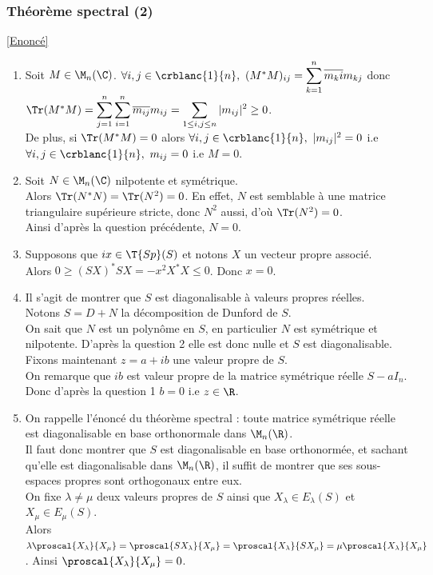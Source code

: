 \documentclass[8pt]{book}
\begin{document}
	\subsubsection{Théorème spectral (2) }
	\label{Théorème spectral (2) corrigé}
	\textcolor{blue}{\hyperref[Théorème spectral (2)]{[Enoncé]}}\\
	\begin{enumerate}[leftmargin=*]
		\item Soit $M\in \M_n(\C)$. $\forall i,j\in \crblanc{1}{n},\ (M^*M)_{ij}=\displaystyle\sum_{k=1}^n\overline{m_ki}m_{kj}$ donc $\Tr(M^*M)=\displaystyle\sum_{j=1}^n\sum_{i=1}^n\overline{m_{ij}}m_{ij}=\sum_{1\leq i,j\leq n}|m_{ij}|^2\geq 0$.\\
		De plus, si $\Tr(M^*M)=0$ alors $\forall i,j\in \crblanc{1}{n},\ |m_{ij}|^2=0$ i.e $\forall i,j\in \crblanc{1}{n},\ m_{ij}=0$ i.e $M=0$.
		\item Soit $N\in \M_n(\C)$ nilpotente et symétrique.\\
		Alors $\Tr(N^*N)=\Tr(N^2)=0$. En effet, $N$ est semblable à une matrice triangulaire supérieure stricte, donc $N^2$ aussi, d'où $\Tr(N^2)=0$.\\
		Ainsi d'après la question précédente, $N=0$.
		\item Supposons que $ix\in \T{Sp}(S)$ et notons $X$ un vecteur propre associé.\\
		Alors $0\geq (SX)^*SX=-x^2X^*X\leq 0$. Donc $x=0$.
		\item Il s'agit de montrer que $S$ est diagonalisable à valeurs propres réelles.\\
		Notons $S=D+N$ la décomposition de Dunford de $S$.\\
		On sait que $N$ est un polynôme en $S$, en particulier $N$ est symétrique et nilpotente. D'après la question 2 elle est donc nulle et $S$ est diagonalisable.\\
		Fixons maintenant $z=a+ib$ une valeur propre de $S$.\\
		On remarque que $ib$ est valeur propre de la matrice symétrique réelle $S-aI_n$. Donc d'après la question 1 $b=0$ i.e $z\in \R$.
		\item On rappelle l'énoncé du théorème spectral : toute matrice symétrique réelle est diagonalisable en base orthonormale dans $\M_n(\R)$.\\
		Il faut donc montrer que $S$ est diagonalisable en base orthonormée, et sachant qu'elle est diagonalisable dans $\M_n(\R)$, il suffit de montrer que ses sous-espaces propres sont orthogonaux entre eux.\\
		On fixe $\lambda\ne \mu$ deux valeurs propres de $S$ ainsi que $X_\lambda\in E_\lambda(S)$ et $X_\mu\in E_\mu(S)$.\\
		Alors $\lambda\proscal{X_\lambda}{X_\mu}=\proscal{SX_\lambda}{X_\mu}=\proscal{X_\lambda}{SX_\mu}=\mu\proscal{X_\lambda}{X_\mu}$. Ainsi $\proscal{X_\lambda}{X_\mu}=0$.
	\end{enumerate}
	
\end{document}
